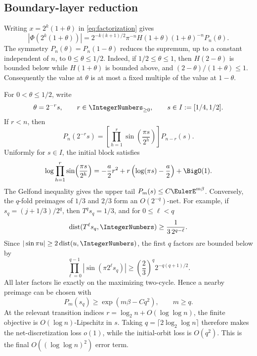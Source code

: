 \documentclass[11pt]{article}
\theoremstyle{definition}
\theoremstyle{remark}
\newcommand{\T}{T}
\begin{document}
\subsection{Boundary-layer reduction}

Writing \(x=2^k(1+\theta)\) in \eqref{eq:factorization} gives
\begin{equation}
 |\Phi(2^k(1+\theta))|
 =2^{-k(k+1)/2}\pi^{-n}
 H(1+\theta)(1+\theta)^{-n}P_n(\theta).
 \label{eq:annulus-exact}
\end{equation}
The symmetry \(P_n(\theta)=P_n(1-\theta)\) reduces the supremum, up to a
constant independent of \(n\), to \(0\le\theta\le1/2\).  Indeed, if
\(1/2\le\theta\le1\), then \(H(2-\theta)\) is bounded below while
\(H(1+\theta)\) is bounded above, and
\((2-\theta)/(1+\theta)\le1\).  Consequently the value at \(\theta\) is at
most a fixed multiple of the value at \(1-\theta\).

For \(0<\theta\le1/2\), write
\begin{equation}
 \theta=2^{-r}s,
 \qquad r\in\IntegerNumbers_{\ge0},
 \qquad s\in I:=[1/4,1/2].
 \label{eq:transition}
\end{equation}
If \(r<n\), then
\begin{equation}
 P_n(2^{-r}s)
 =\left[\prod_{h=1}^{r}\sin\!\left(\frac{\pi s}{2^h}\right)\right]
 P_{n-r}(s).
 \label{eq:transition-product}
\end{equation}
Uniformly for \(s\in I\), the initial block satisfies
\begin{equation}
 \log\prod_{h=1}^{r}\sin\!\left(\frac{\pi s}{2^h}\right)
 =-\frac a2r^2+r\left(\log(\pi s)-\frac a2\right)+\BigO(1).
 \label{eq:small-block}
\end{equation}
The Gelfond inequality gives the upper tail
\(P_m(s)\le C\EulerE^{m\beta}\).  Conversely, the \(q\)-fold preimages of
\(1/3\) and \(2/3\) form an \(O(2^{-q})\)-net.  For example, if
\(s_q=(j+1/3)/2^q\), then \(\T^qs_q=1/3\), and for \(0\le \ell<q\)
\[
 \operatorname{dist}(\T^\ell s_q,\IntegerNumbers)
 \ge \frac1{3\,2^{q-\ell}}.
\]
Since \(|\sin\pi u|\ge2\operatorname{dist}(u,\IntegerNumbers)\), the first \(q\)
factors are bounded below by
\[
 \prod_{\ell=0}^{q-1}|\sin(\pi2^\ell s_q)|
 \ge \left(\frac23\right)^q2^{-q(q+1)/2}.
\]
All later factors lie exactly on the maximizing two-cycle.  Hence a nearby
preimage can be chosen with
\begin{equation}
 P_m(s_q)\ge\exp(m\beta-Cq^2),
 \qquad m\ge q.
 \label{eq:dense-preimages}
\end{equation}
At the relevant transition indices \(r=\log_2 n+O(\log\log n)\), the finite
objective is \(O(\log n)\)-Lipschitz in \(s\).  Taking
\(q=\lceil2\log_2\log n\rceil\) therefore makes the net-discretization loss
\(o(1)\), while the initial-orbit loss is \(O(q^2)\).  This is the final
\(O((\log\log n)^2)\) error term.
\end{document}
